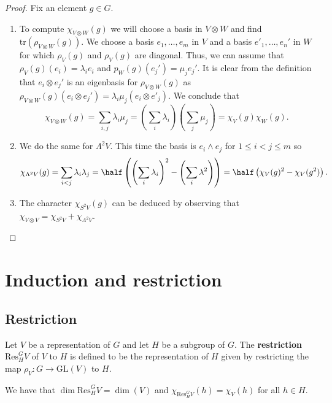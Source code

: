 \documentclass[12pt, a4paper]{article}
\newcommand{\gl}{\text{GL}}
\begin{document}
\begin{proof}
    Fix an element \(g\in G\).
    \begin{enumerate}
        \item To compute \(\chi_{V \otimes W}(g)\) we will choose a basis in \(V \otimes W\) and find \(\text{tr}(\rho_{V \otimes W}(g))\). We choose a basis \(e_1,\ldots,e_m\) in \(V\) and a basis \(e'_1,\ldots,e_n'\) in \(W\) for which \(\rho_V(g)\) and \(\rho_V(g)\) are diagonal. Thus, we can assume that \(\rho_V(g)(e_i)=\lambda_i e_i\) and \(p_W(g)(e_j') = \mu_j e_j'\). It is clear from the definition that \(e_i \otimes e_j'\) is an eigenbasis for \(\rho_{V \otimes W}(g)\) as \(\rho_{V\otimes W}(g)(e_i\otimes e_j')=\lambda_i\mu_j (e_i\otimes e'_j)\). We conclude that 
        \[\chi_{V\otimes W}(g)=\sum_{i,j}\lambda_i\mu_j = \left( \sum_i \lambda_i \right) \left( \sum_j \mu_j \right) = \chi_V(g)\chi_W(g).\]
        \item We do the same for \(\Lambda^2V\). This time the basis is \(e_i\wedge e_j\) for \(1\leq i<j\leq m\) so 
        \[\chi_{\Lambda^2V}(g)=\sum_{i<j} \lambda_i \lambda_j = \half \left( \left( \sum_i \lambda_i \right)^2-\left( \sum_i \lambda^2 \right) \right) = \half \left( \chi_V(g)^2-\chi_V(g^2) \right).\]
        \item The character \(\chi_{S^2V}(g)\) can be deduced by observing that \(\chi_{V \otimes V}=\chi_{S^2V}+\chi_{\Lambda^2V}\).
    \end{enumerate}
\end{proof}

\section{Induction and restriction}

\subsection{Restriction}

\begin{definition}
    Let \(V\) be a representation of \(G\) and let \(H\) be a subgroup of \(G\). The \textbf{restriction} \(\text{Res}_H^G V\) of \(V\) to \(H\) is defined to be the representation of \(H\) given by restricting the map \(\rho_V :G \to \gl(V)\) to \(H\). 
\end{definition}

\begin{proposition}
    We have that \(\dim\text{Res}_H^G V=\dim(V)\) and \(\chi_{\text{Res}_H^G V}(h)=\chi_V(h)\) for all \(h\in H\). 
\end{proposition}
\end{document}

